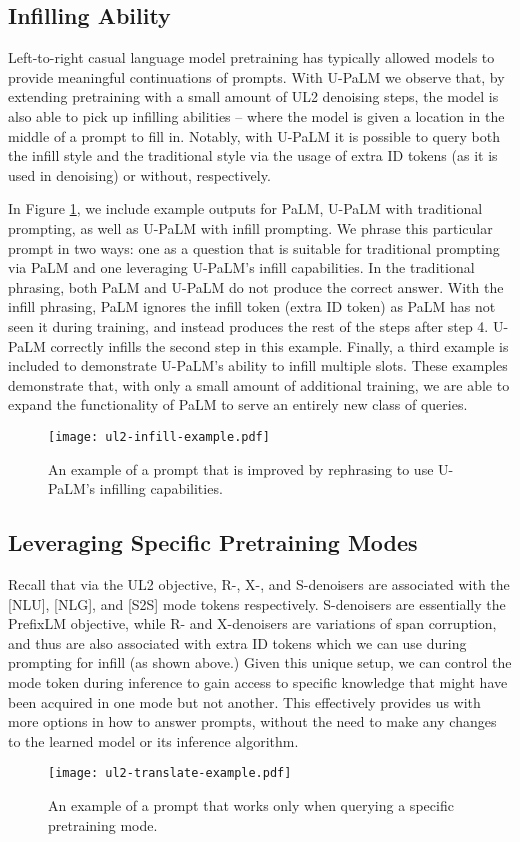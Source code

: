 \documentclass{article}
\newcommand{\modelname}{U-PaLM\xspace}
\begin{document}
\subsection{Infilling Ability}
Left-to-right casual language model pretraining has typically allowed models to provide meaningful continuations of prompts. With \modelname we observe that, by extending pretraining with a small amount of UL2 denoising steps, the model is also able to pick up infilling abilities -- where the model is given a location in the middle of a prompt to fill in. Notably, with \modelname it is possible to query both the infill style and the traditional style via the usage of extra ID tokens (as it is used in denoising) or without, respectively.

In Figure \ref{fig:infill-examples}, we include example outputs for PaLM, \modelname with traditional prompting, as well as \modelname with infill prompting. We phrase this particular prompt in two ways: one as a question that is suitable for traditional prompting via PaLM and one leveraging \modelname's infill capabilities. In the traditional phrasing, both PaLM and \modelname do not produce the correct answer. With the infill phrasing, PaLM ignores the infill token (extra ID token) as PaLM has not seen it during training, and instead produces the rest of the steps after step 4. \modelname correctly infills the second step in this example. Finally, a third example is included to demonstrate \modelname's ability to infill multiple slots. These examples demonstrate that, with only a small amount of additional training, we are able to expand the functionality of PaLM to serve an entirely new class of queries.
\begin{figure}[H]
\texttt{[image: ul2-infill-example.pdf]}
\caption{An example of a prompt that is improved by rephrasing to use \modelname's infilling capabilities.}
\label{fig:infill-examples}
\end{figure}


\subsection{Leveraging Specific Pretraining Modes}
Recall that via the UL2 objective, R-, X-, and S-denoisers are associated with the [NLU], [NLG], and [S2S] mode tokens respectively. S-denoisers are essentially the PrefixLM objective, while R- and X-denoisers are variations of span corruption, and thus are also associated with extra ID tokens which we can use during prompting for infill (as shown above.) Given this unique setup, we can control the mode token during inference to gain access to specific knowledge that might have been acquired in one mode but not another. This effectively provides us with more options in how to answer prompts, without the need to make any changes to the learned model or its inference algorithm.
\begin{figure}[H]
\texttt{[image: ul2-translate-example.pdf]}
\caption{An example of a prompt that works only when querying a specific pretraining mode.}
\label{fig:mode-infill-examples}
\end{figure}
\end{document}
